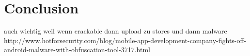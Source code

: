 \chapter{Conclusion}\label{chapter:conclusion}

auch wichtig weil wenn crackable dann upload zu stores und dann malware \newline
http://www.hotforsecurity.com/blog/mobile-app-development-company-fights-off-android-malware-with-obfuscation-tool-3717.html\newline



